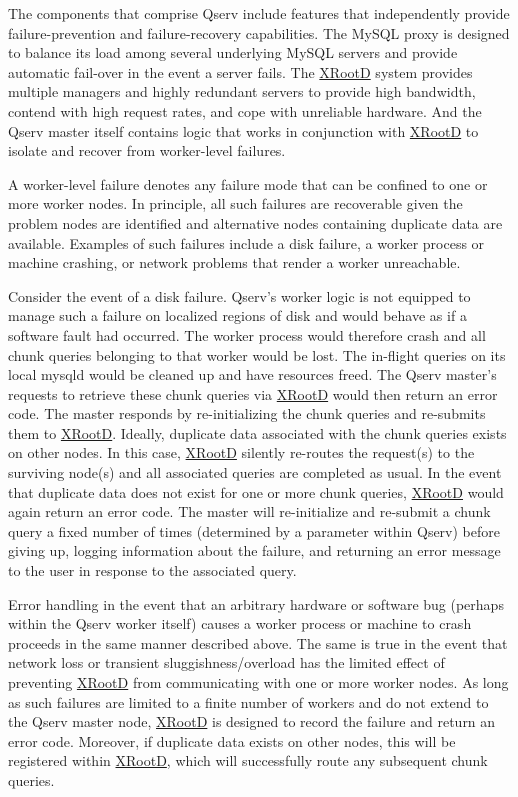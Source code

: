 \documentclass[DM,lsstdraft,toc]{lsstdoc}
\begin{document}
The components that comprise Qserv include features that independently
provide failure-prevention and failure-recovery capabilities. The MySQL
proxy is designed to balance its load among several underlying MySQL
servers and provide automatic fail-over in the event a server fails. The
\href{http://xrootd.org}{XRootD} system provides multiple managers and
highly redundant servers to provide high bandwidth, contend with high
request rates, and cope with unreliable hardware. And the Qserv master
itself contains logic that works in conjunction with
\href{http://xrootd.org}{XRootD} to isolate and recover from
worker-level failures.

A worker-level failure denotes any failure mode that can be confined to
one or more worker nodes. In principle, all such failures are
recoverable given the problem nodes are identified and alternative nodes
containing duplicate data are available. Examples of such failures
include a disk failure, a worker process or machine crashing, or network
problems that render a worker unreachable.

Consider the event of a disk failure. Qserv's worker logic is not
equipped to manage such a failure on localized regions of disk and would
behave as if a software fault had occurred. The worker process would
therefore crash and all chunk queries belonging to that worker would be
lost. The in-flight queries on its local mysqld would be cleaned up and
have resources freed. The Qserv master's requests to retrieve these
chunk queries via \href{http://xrootd.org}{XRootD} would then return an
error code. The master responds by re-initializing the chunk queries and
re-submits them to \href{http://xrootd.org}{XRootD}. Ideally, duplicate
data associated with the chunk queries exists on other nodes. In this
case, \href{http://xrootd.org}{XRootD} silently re-routes the request(s)
to the surviving node(s) and all associated queries are completed as
usual. In the event that duplicate data does not exist for one or more
chunk queries, \href{http://xrootd.org}{XRootD} would again return an
error code. The master will re-initialize and re-submit a chunk query a
fixed number of times (determined by a parameter within Qserv) before
giving up, logging information about the failure, and returning an error
message to the user in response to the associated query.

Error handling in the event that an arbitrary hardware or software bug
(perhaps within the Qserv worker itself) causes a worker process or
machine to crash proceeds in the same manner described above. The same
is true in the event that network loss or transient
sluggishness/overload has the limited effect of preventing
\href{http://xrootd.org}{XRootD} from communicating with one or more
worker nodes. As long as such failures are limited to a finite number of
workers and do not extend to the Qserv master node,
\href{http://xrootd.org}{XRootD} is designed to record the failure and
return an error code. Moreover, if duplicate data exists on other nodes,
this will be registered within \href{http://xrootd.org}{XRootD}, which
will successfully route any subsequent chunk queries.
\end{document}
